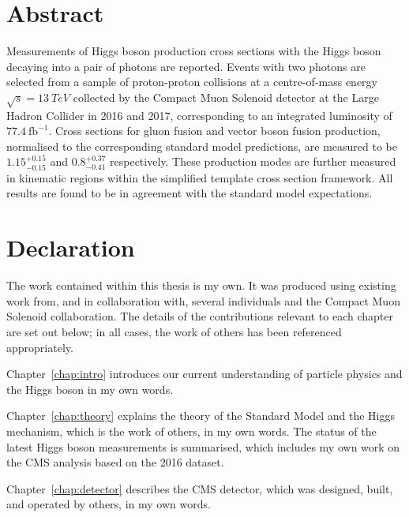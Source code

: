 \chapter*{\centering Abstract}
Measurements of Higgs boson production cross sections 
with the Higgs boson decaying into a pair of photons are reported.
Events with two photons are selected from a sample of proton-proton collisions 
at a centre-of-mass energy $\sqrt{s} = \SI{13}{TeV}$ 
collected by the Compact Muon Solenoid detector at the Large Hadron Collider in 2016 and 2017,
corresponding to an integrated luminosity of $77.4~\mathrm{fb}^{-1}$.
Cross sections for gluon fusion and vector boson fusion production, 
normalised to the corresponding standard model predictions,
are measured to be $1.15_{-0.15}^{+0.15}$ and $0.8_{-0.41}^{+0.37}$ respectively.
These production modes are further measured in kinematic regions 
within the simplified template cross section framework.
All results are found to be in agreement with the standard model expectations.




\chapter*{\centering Declaration}
The work contained within this thesis is my own. 
It was produced using existing work from, and in collaboration with, 
several individuals and the Compact Muon Solenoid collaboration. 
The details of the contributions relevant to each chapter are set out below;
in all cases, the work of others has been referenced appropriately.

Chapter~\ref{chap:intro} introduces our current understanding of particle physics 
and the Higgs boson in my own words.

Chapter~\ref{chap:theory} explains the theory of the Standard Model and the Higgs mechanism, 
which is the work of others, in my own words. 
The status of the latest Higgs boson measurements is summarised, 
which includes my own work on the CMS \Hgg analysis based on the 2016 dataset.

Chapter~\ref{chap:detector} describes the CMS detector, 
which was designed, built, and operated by others, in my own words.

